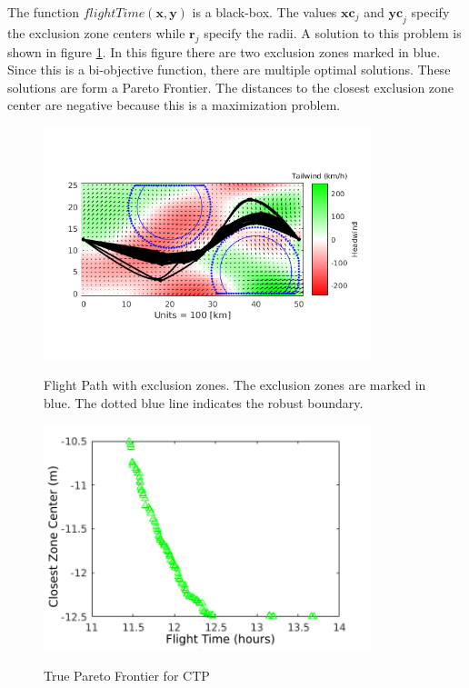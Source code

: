 \documentclass{article}
\begin{document}
\noindent The function $flightTime(\textbf{x},\textbf{y})$ is a black-box. The values $\textbf{xc}_j$ and  $\textbf{yc}_j$ specify the exclusion zone centers while $\textbf{r}_j$ specify the radii. A solution to this problem is shown in figure \ref{fig:FPP}.  In this figure there are two exclusion zones marked in blue. Since this is a bi-objective function, there are multiple optimal solutions.  These solutions are form a Pareto Frontier.  The distances to the closest exclusion zone center are negative because this is a maximization problem.
\begin{figure}[H]
  \caption{Flight Path with exclusion zones. The exclusion zones are marked in blue.  The dotted blue line indicates the robust boundary.}
  \centering
  \includegraphics[width=0.85\textwidth]{FPP.png}  
  \label{fig:FPP}
\end{figure}
	
\begin{figure}[H]
  \caption{True Pareto Frontier for CTP}
  \centering
  \includegraphics[width=0.85\textwidth]{FPP_pareto_units.png}  
  \label{fig:FPP_pareto}
\end{figure}
\end{document}
